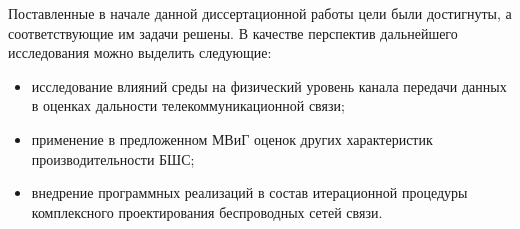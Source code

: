 Поставленные в начале данной диссертационной работы цели были достигнуты, а соответствующие им задачи решены. В качестве перспектив дальнейшего исследования можно выделить следующие:
\begin{itemize}
    \item исследование влияний среды на физический уровень канала передачи данных в оценках дальности телекоммуникационной связи;
    \item применение в предложенном МВиГ оценок других характеристик производительности БШС;
    \item внедрение программных реализаций в состав итерационной процедуры комплексного проектирования беспроводных сетей связи.
\end{itemize}




% 

